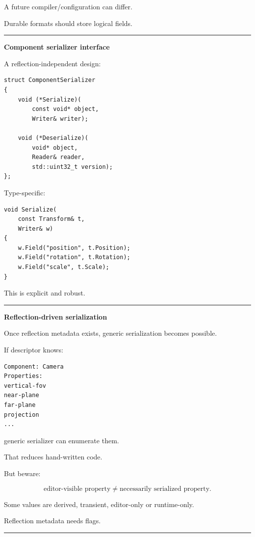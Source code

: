 A future compiler/configuration can differ.

Durable formats should store logical fields.

\begin{center}\rule{0.5\linewidth}{0.5pt}\end{center}

\textbf{Component serializer interface}

A reflection-independent design:

\begin{verbatim}
struct ComponentSerializer
{
    void (*Serialize)(
        const void* object,
        Writer& writer);

    void (*Deserialize)(
        void* object,
        Reader& reader,
        std::uint32_t version);
};
\end{verbatim}

Type-specific:

\begin{verbatim}
void Serialize(
    const Transform& t,
    Writer& w)
{
    w.Field("position", t.Position);
    w.Field("rotation", t.Rotation);
    w.Field("scale", t.Scale);
}
\end{verbatim}

This is explicit and robust.

\begin{center}\rule{0.5\linewidth}{0.5pt}\end{center}

\textbf{Reflection-driven serialization}

Once reflection metadata exists, generic serialization becomes possible.

If descriptor knows:

\begin{verbatim}
Component: Camera
Properties:
vertical-fov
near-plane
far-plane
projection
...
\end{verbatim}

generic serializer can enumerate them.

That reduces hand-written code.

But beware:

\[
\boxed{
\text{editor-visible property}
\neq
\text{necessarily serialized property}.
}
\]

Some values are derived, transient, editor-only or runtime-only.

Reflection metadata needs flags.

\begin{center}\rule{0.5\linewidth}{0.5pt}\end{center}


